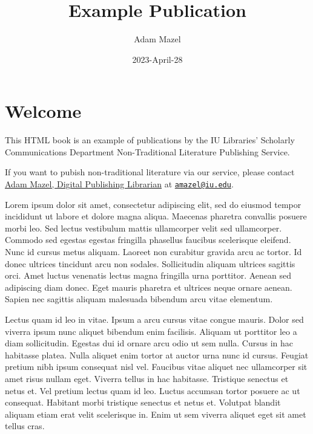 \documentclass[
  11pt,
  letterpaper,
]{book}
\title{Example Publication}
\author{Adam Mazel}
\date{2023-April-28}
\renewcommand*\contentsname{Table of contents}
\newcommand\contentsname{Table of contents}
\begin{document}
\frontmatter
\maketitle
\ifdefined\Shaded\renewenvironment{Shaded}{\begin{tcolorbox}[sharp corners, breakable, boxrule=0pt, borderline west={3pt}{0pt}{shadecolor}, enhanced, interior hidden, frame hidden]}{\end{tcolorbox}}\fi

\renewcommand*\contentsname{Contents}
{
\hypersetup{linkcolor=}
\setcounter{tocdepth}{2}
\tableofcontents
}
\listoffigures
\listoftables
\mainmatter
{}

\hypertarget{welcome}{%
\chapter*{Welcome}\label{welcome}}


This HTML book is an example of publications by the IU Libraries'
Scholarly Communications Department Non-Traditional Literature
Publishing Service.

If you want to pubish non-traditional literature via our service, please
contact \href{https://libraries.indiana.edu/adam-mazel}{Adam Mazel,
Digital Publishing Librarian} at
\href{mailto:amazel@iu.edu}{\nolinkurl{amazel@iu.edu}}.

Lorem ipsum dolor sit amet, consectetur adipiscing elit, sed do eiusmod
tempor incididunt ut labore et dolore magna aliqua. Maecenas pharetra
convallis posuere morbi leo. Sed lectus vestibulum mattis ullamcorper
velit sed ullamcorper. Commodo sed egestas egestas fringilla phasellus
faucibus scelerisque eleifend. Nunc id cursus metus aliquam. Laoreet non
curabitur gravida arcu ac tortor. Id donec ultrices tincidunt arcu non
sodales. Sollicitudin aliquam ultrices sagittis orci. Amet luctus
venenatis lectus magna fringilla urna porttitor. Aenean sed adipiscing
diam donec. Eget mauris pharetra et ultrices neque ornare aenean. Sapien
nec sagittis aliquam malesuada bibendum arcu vitae elementum.

Lectus quam id leo in vitae. Ipsum a arcu cursus vitae congue mauris.
Dolor sed viverra ipsum nunc aliquet bibendum enim facilisis. Aliquam ut
porttitor leo a diam sollicitudin. Egestas dui id ornare arcu odio ut
sem nulla. Cursus in hac habitasse platea. Nulla aliquet enim tortor at
auctor urna nunc id cursus. Feugiat pretium nibh ipsum consequat nisl
vel. Faucibus vitae aliquet nec ullamcorper sit amet risus nullam eget.
Viverra tellus in hac habitasse. Tristique senectus et netus et. Vel
pretium lectus quam id leo. Luctus accumsan tortor posuere ac ut
consequat. Habitant morbi tristique senectus et netus et. Volutpat
blandit aliquam etiam erat velit scelerisque in. Enim ut sem viverra
aliquet eget sit amet tellus cras.
\end{document}
